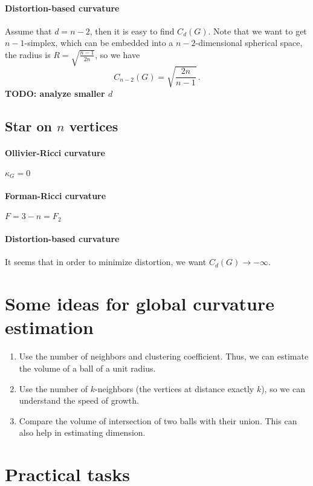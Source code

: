 \documentclass{article}
\begin{document}
\paragraph{Distortion-based curvature} Assume that $d = n-2$, then it is easy to find $C_d(G)$. Note that we want to get $n-1$-simplex, which can be embedded into a $n-2$-dimensional spherical space, the radius is $R = \sqrt{\frac{n-1}{2n}}$, so we have
\[
C_{n-2}(G) = \sqrt{\frac{2n}{n-1}}\,.
\]
\textbf{TODO: analyze smaller $d$}

\subsection{Star on $n$ vertices}

\paragraph{Ollivier-Ricci curvature} $\kappa_G = 0$

\paragraph{Forman-Ricci curvature} $F = 3-n = F_2$

\paragraph{Distortion-based curvature} It seems that in order to minimize distortion, we want $C_d(G) \to -\infty$.
    
\section{Some ideas for global curvature estimation}

\begin{enumerate}
    \item Use the number of neighbors and clustering coefficient. Thus, we can estimate the volume of a ball of a unit radius. 
    \item Use the number of $k$-neighbors (the vertices at distance exactly $k$), so we can understand the speed of growth.
    \item Compare the volume of intersection of two balls with their union. This can also help in estimating dimension.
\end{enumerate}
            
\section{Practical tasks}
\end{document}
